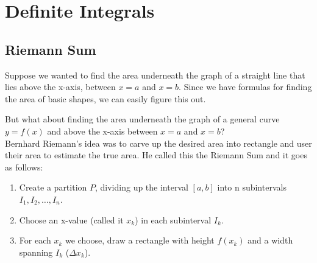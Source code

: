 \chapter{Definite Integrals}

\section{Riemann Sum}

Suppose we wanted to find the area underneath the graph of a straight line that lies above the x-axis, between $ x = a $ and $  x = b $. Since we have formulas for finding the area of basic shapes, we can easily figure this out. \\

\begin{figure}[H]
    \centering
\end{figure}

But what about finding the area underneath the graph of a general curve $ y = f(x) $ and above the x-axis between $  x = a $ and $ x = b $? \\

Bernhard Riemann's idea was to carve up the desired area into rectangle and user their area to estimate the true area. He called this the Riemann Sum and it goes as follows: \\

\begin{enumerate}
    \item
          Create a partition $ P $, dividing up the interval $ [a, b] $ into n subintervals $ I_1, I_2, \dots, I_n $. \\

    \item
          Choose an x-value (called it $ x_k $) in each subinterval $ I_k $. \\

    \item
          For each $ x_k $ we choose, draw a rectangle with height $ f(x_k) $ and a width spanning $ I_k $ ($ \Delta x_k $). \\
\end{enumerate}

